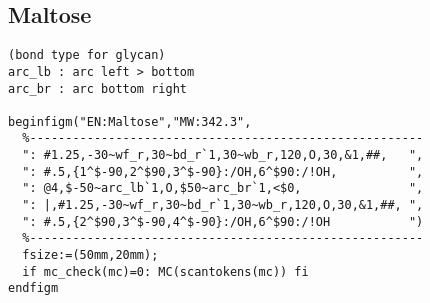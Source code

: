 \documentclass[a4paper]{article}
\begin{document}
\subsection{Maltose}
\begin{verbatim}
(bond type for glycan)
arc_lb : arc left > bottom
arc_br : arc bottom right

beginfigm("EN:Maltose","MW:342.3",
  %-------------------------------------------------------
  ": #1.25,-30~wf_r,30~bd_r`1,30~wb_r,120,O,30,&1,##,   ",
  ": #.5,{1^$-90,2^$90,3^$-90}:/OH,6^$90:/!OH,          ",
  ": @4,$-50~arc_lb`1,O,$50~arc_br`1,<$0,               ",
  ": |,#1.25,-30~wf_r,30~bd_r`1,30~wb_r,120,O,30,&1,##, ",
  ": #.5,{2^$90,3^$-90,4^$-90}:/OH,6^$90:/!OH           ")
  %-------------------------------------------------------
  fsize:=(50mm,20mm);
  if mc_check(mc)=0: MC(scantokens(mc)) fi
endfigm
\end{verbatim}
\newpage
\end{document}
